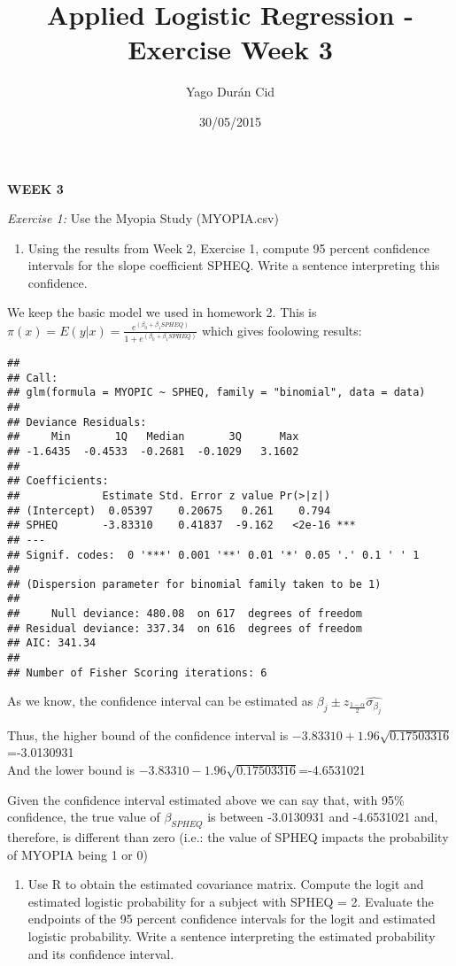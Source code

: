 \documentclass[]{article}
\title{Applied Logistic Regression - Exercise Week 3}
\author{Yago Durán Cid}
\date{30/05/2015}
\begin{document}
\maketitle


\textbf{WEEK 3}

\emph{Exercise 1:} Use the Myopia Study (MYOPIA.csv)

\begin{enumerate}
\def\labelenumi{\alph{enumi}.}
\itemsep1pt\parskip0pt
\item
  Using the results from Week 2, Exercise 1, compute 95 percent
  confidence intervals for the slope coefficient SPHEQ. Write a sentence
  interpreting this confidence.
\end{enumerate}

We keep the basic model we used in homework 2. This is
$\pi(x)=E(y|x)=\frac{e^{(\beta_0+\beta_1SPHEQ)}}{1+e^{(\beta_0+\beta_1SPHEQ)}}$
which gives foolowing results:

\begin{verbatim}
## 
## Call:
## glm(formula = MYOPIC ~ SPHEQ, family = "binomial", data = data)
## 
## Deviance Residuals: 
##     Min       1Q   Median       3Q      Max  
## -1.6435  -0.4533  -0.2681  -0.1029   3.1602  
## 
## Coefficients:
##             Estimate Std. Error z value Pr(>|z|)    
## (Intercept)  0.05397    0.20675   0.261    0.794    
## SPHEQ       -3.83310    0.41837  -9.162   <2e-16 ***
## ---
## Signif. codes:  0 '***' 0.001 '**' 0.01 '*' 0.05 '.' 0.1 ' ' 1
## 
## (Dispersion parameter for binomial family taken to be 1)
## 
##     Null deviance: 480.08  on 617  degrees of freedom
## Residual deviance: 337.34  on 616  degrees of freedom
## AIC: 341.34
## 
## Number of Fisher Scoring iterations: 6
\end{verbatim}

As we know, the confidence interval can be estimated as
$\beta_j \pm z_{\frac{1-\alpha}{2}}\hat{\sigma_{\beta_j}}$

Thus, the higher bound of the confidence interval is
$-3.83310 + 1.96\sqrt{0.17503316}$=-3.0130931\\And the lower bound is
$-3.83310 - 1.96\sqrt{0.17503316}$=-4.6531021

Given the confidence interval estimated above we can say that, with 95\%
confidence, the true value of $\beta_{SPHEQ}$ is between -3.0130931 and
-4.6531021 and, therefore, is different than zero (i.e.: the value of
SPHEQ impacts the probability of MYOPIA being 1 or 0)

\begin{enumerate}
\def\labelenumi{\alph{enumi}.}
\setcounter{enumi}{1}
\itemsep1pt\parskip0pt
\item
  Use R to obtain the estimated covariance matrix. Compute the logit and
  estimated logistic probability for a subject with SPHEQ = 2. Evaluate
  the endpoints of the 95 percent confidence intervals for the logit and
  estimated logistic probability. Write a sentence interpreting the
  estimated probability and its confidence interval.
\end{enumerate}
\end{document}
